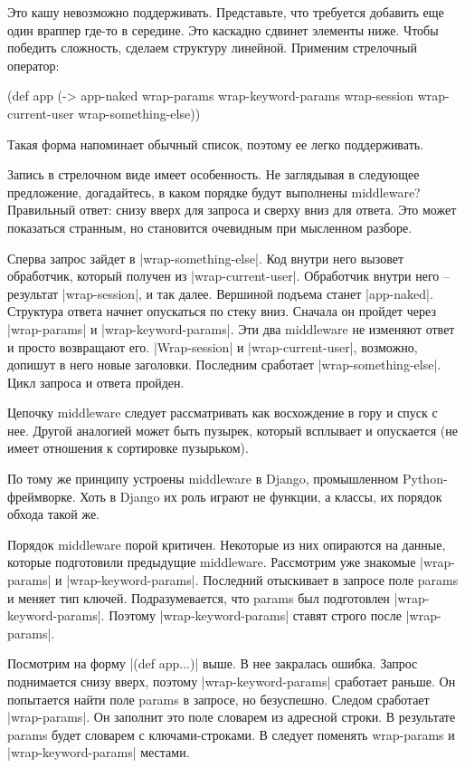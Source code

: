 Это кашу невозможно поддерживать. Представьте, что требуется добавить еще один
враппер где-то в середине. Это каскадно сдвинет элементы ниже. Чтобы победить
сложность, сделаем структуру линейной. Применим стрелочный оператор:

\begin{code}
(def app
  (-> app-naked
      wrap-params
      wrap-keyword-params
      wrap-session
      wrap-current-user
      wrap-something-else))
\end{code}

Такая форма напоминает обычный список, поэтому ее легко поддерживать.

Запись в стрелочном виде имеет особенность. Не заглядывая в следующее
предложение, догадайтесь, в каком порядке будут выполнены middleware? Правильный
ответ: снизу вверх для запроса и сверху вниз для ответа. Это может показаться
странным, но становится очевидным при мысленном разборе.

Сперва запрос зайдет в \spverb|wrap-something-else|. Код внутри него вызовет
обработчик, который получен из \spverb|wrap-current-user|. Обработчик внутри него –
результат \spverb|wrap-session|, и так далее. Вершиной подъема станет
\spverb|app-naked|. Структура ответа начнет опускаться по стеку вниз. Сначала он
пройдет через \spverb|wrap-params| и \spverb|wrap-keyword-params|. Эти два middleware не
изменяют ответ и просто возвращают его. \spverb|Wrap-session| и \spverb|wrap-current-user|,
возможно, допишут в него новые заголовки. Последним сработает
\spverb|wrap-something-else|. Цикл запроса и ответа пройден.

Цепочку middleware следует рассматривать как восхождение в гору и спуск с
нее. Другой аналогией может быть пузырек, который всплывает и опускается (не
имеет отношения к сортировке пузырьком).

По тому же принципу устроены middleware в Django, промышленном
Python-фреймворке. Хоть в Django их роль играют не функции, а классы, их порядок
обхода такой же.

Порядок middleware порой критичен. Некоторые из них опираются на данные, которые
подготовили предыдущие middleware. Рассмотрим уже знакомые \spverb|wrap-params| и
\spverb|wrap-keyword-params|. Последний отыскивает в запросе поле params и меняет тип
ключей. Подразумевается, что params был подготовлен
\spverb|wrap-keyword-params|. Поэтому \spverb|wrap-keyword-params| ставят строго после
\spverb|wrap-params|.

Посмотрим на форму \spverb|(def app...)| выше. В нее закралась ошибка. Запрос
поднимается снизу вверх, поэтому \spverb|wrap-keyword-params| сработает раньше. Он
попытается найти поле params в запросе, но безуспешно. Следом сработает
\spverb|wrap-params|. Он заполнит это поле словарем из адресной строки. В результате
params будет словарем с ключами-строками. В следует поменять wrap-params и
\spverb|wrap-keyword-params| местами.

